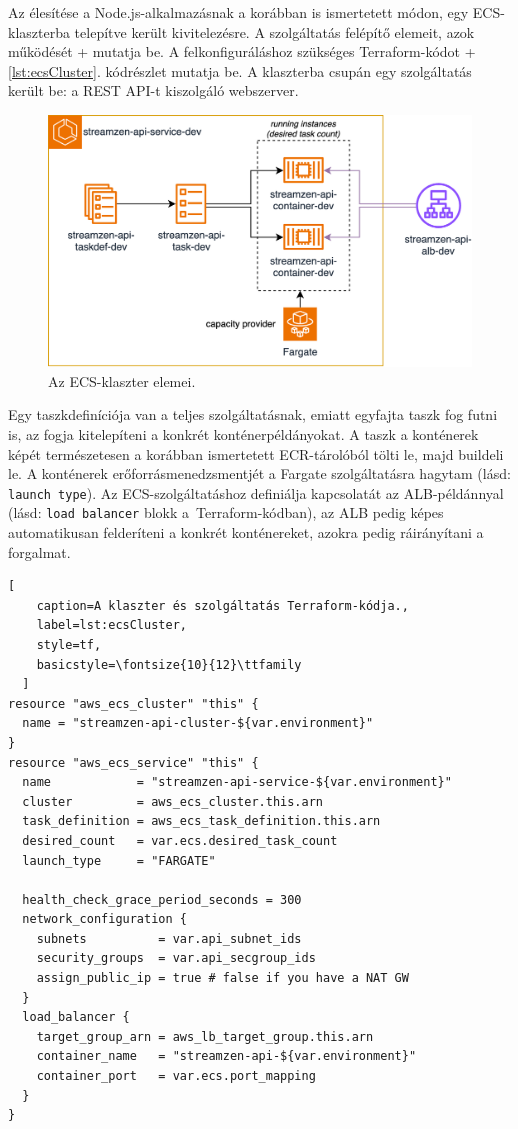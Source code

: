 Az élesítése a Node.js-alkalmazásnak a korábban is ismertetett módon, egy ECS-klaszterba telepítve került kivitelezésre. A szolgáltatás felépítő elemeit, azok működését \az+ mutatja be. A felkonfiguráláshoz szükséges Terraform-kódot \az+\ref{lst:ecsCluster}. kódrészlet mutatja be. A klaszterba csupán egy szolgáltatás került be: a REST API-t kiszolgáló webszerver.

\begin{figure}[h]
  \centering
  \includegraphics[width=120mm, keepaspectratio]{figures/dipterv_ecs.png}
  \caption{Az ECS-klaszter elemei.}
  \label{fig:ecscluster}
\end{figure}

Egy taszkdefiníciója van a teljes szolgáltatásnak, emiatt egyfajta taszk fog futni is, az fogja kitelepíteni a konkrét konténerpéldányokat. A taszk a konténerek képét természetesen a korábban ismertetett ECR-tárolóból tölti le, majd buildeli le. A konténerek erőforrásmenedzsmentjét a Fargate szolgáltatásra hagytam (lásd: \verb|launch type|). Az ECS-szolgáltatáshoz definiálja kapcsolatát az ALB-példánnyal (lásd: \verb|load balancer| blokk a~Terraform-kódban), az ALB pedig képes automatikusan felderíteni a konkrét konténereket, azokra pedig ráirányítani a forgalmat.

\begin{minipage}{0.92\textwidth}
  \begin{lstlisting}[
    caption=A klaszter és szolgáltatás Terraform-kódja.,
    label=lst:ecsCluster,
    style=tf,
    basicstyle=\fontsize{10}{12}\ttfamily
  ]
resource "aws_ecs_cluster" "this" {
  name = "streamzen-api-cluster-${var.environment}"
}
resource "aws_ecs_service" "this" {
  name            = "streamzen-api-service-${var.environment}"
  cluster         = aws_ecs_cluster.this.arn
  task_definition = aws_ecs_task_definition.this.arn
  desired_count   = var.ecs.desired_task_count
  launch_type     = "FARGATE"

  health_check_grace_period_seconds = 300
  network_configuration {
    subnets          = var.api_subnet_ids
    security_groups  = var.api_secgroup_ids
    assign_public_ip = true # false if you have a NAT GW
  }
  load_balancer {
    target_group_arn = aws_lb_target_group.this.arn
    container_name   = "streamzen-api-${var.environment}"
    container_port   = var.ecs.port_mapping
  }
}
\end{lstlisting}
\end{minipage}

